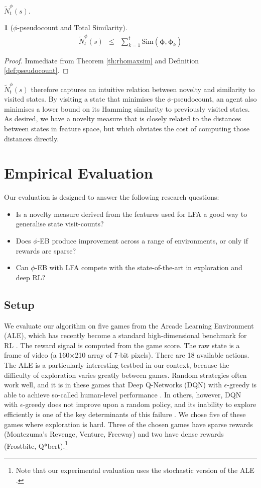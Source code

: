 \documentclass{article}
\theoremstyle{definition}
\theoremstyle{definition}
\theoremstyle{plain}
\theoremstyle{plain}
\theoremstyle{plain}
\newtheorem{cor}{\protect\corollaryname}
\providecommand{\corollaryname}{Corollary}
\begin{document}
$\tilde{N}_{t}^{\phi}(s)$.
\begin{cor}
[$\phi$-pseudocount and Total Similarity]\label{cor:avgsim}\emph{
\begin{eqnarray*}
\tilde{N}_{t}^{\phi}(s) & \leq & \sum_{k=1}^{t}\mbox{Sim}(\bm{\phi},\bm{\phi}_{k})
\end{eqnarray*}
}\end{cor}
\begin{proof}
Immediate from Theorem \ref{th:rhomaxsim} and Definition \ref{def:pseudocount}. 
\end{proof}
\noindent $\tilde{N}_{t}^{\phi}(s)$ therefore captures an intuitive
relation between novelty and similarity to visited states. By visiting
a state that minimises the $\phi$-pseudocount, an agent also minimises
a lower bound on its Hamming similarity to previously visited states.
As desired, we have a novelty measure that is closely related to the
distances between states in feature space, but which obviates the
cost of computing those distances directly.


\section{Empirical Evaluation}

Our evaluation is designed to answer the following research questions:
\begin{itemize}
\item Is a novelty measure derived from the features used for LFA a good
way to generalise state visit-counts?
\item Does $\phi$-EB produce improvement across a range of environments,
or only if rewards are sparse?
\item Can $\phi$-EB with LFA compete with the state-of-the-art in exploration
and deep RL?
\end{itemize}

\subsection{Setup}

We evaluate our algorithm on five games from the Arcade Learning Environment
(ALE), which has recently become a standard high-dimensional benchmark
for RL \cite{BNVB:2013ale}. The reward signal is computed from the
game score. The raw state is a frame of video (a 160$\times$210 array
of 7-bit pixels). There are 18 available actions. The ALE is a particularly
interesting testbed in our context, because the difficulty of exploration
varies greatly between games. Random strategies often work well, and
it is in these games that Deep Q-Networks (DQN) with $\epsilon$-greedy
is able to achieve so-called human-level performance \cite{Mnih2015}.
In others, however, DQN with $\epsilon$-greedy does not improve upon
a random policy, and its inability to explore efficiently is one of
the key determinants of this failure \cite{DBLP:journals/corr/OsbandBPR16}.
We chose five of these games where exploration is hard. Three of the
chosen games have sparse rewards (Montezuma's Revenge, Venture, Freeway)
and two have dense rewards (Frostbite, Q{*}bert).\footnote{Note that our experimental evaluation uses the stochastic version
of the ALE \cite{BNVB:2013ale}.} 
\end{document}
